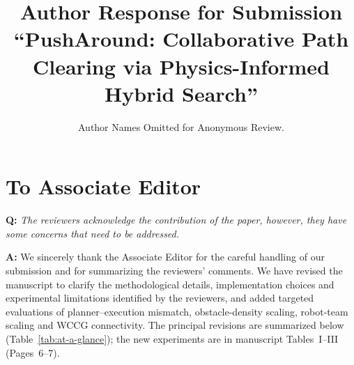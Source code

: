 \documentclass[11pt]{article}
\begin{document}
\title{Author Response for Submission\\
``PushAround: Collaborative Path Clearing via Physics-Informed Hybrid Search''}
\author{Author Names Omitted for Anonymous Review.}
\date{}
\maketitle

\section*{To Associate Editor}
\begin{shaded*}
\noindent \textbf{Q:}
{\itshape
The reviewers acknowledge the contribution of the paper, however, they
have some concerns that need to be addressed.
}
\end{shaded*}

\noindent \textbf{A:}
We sincerely thank the Associate Editor for the careful handling of our
submission and for summarizing the reviewers' comments. We have revised the
manuscript to clarify the methodological details, implementation choices and
experimental limitations identified by the reviewers, and added targeted
evaluations of planner--execution mismatch, obstacle-density scaling, robot-team
scaling and WCCG connectivity. The principal revisions are summarized below
(Table~\ref{tab:at-a-glance}); the new experiments are in manuscript
Tables~I--III (Pages~6--7).
\end{document}
